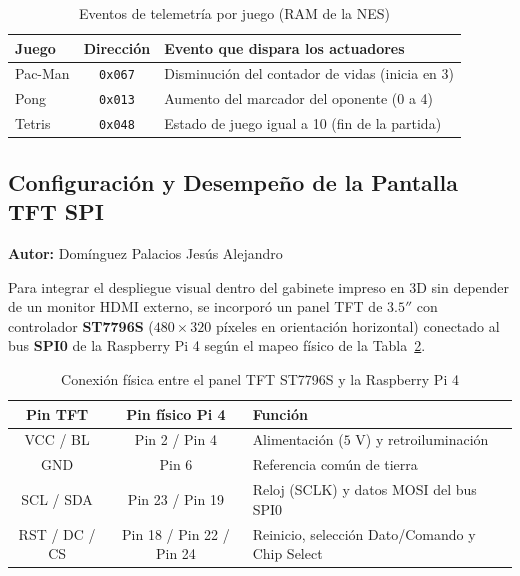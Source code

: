 \begin{table}[H]
	\centering
	\caption{Eventos de telemetría por juego (RAM de la NES)}
	\label{tab:telemetria_juegos}
	\footnotesize
	\begin{tabular}{|l|c|p{5.6cm}|}
		\hline
		\textbf{Juego} & \textbf{Dirección} & \textbf{Evento que dispara los actuadores} \\
		\hline
		Pac-Man & \texttt{0x067} & Disminución del contador de vidas (inicia en 3) \\
		\hline
		Pong & \texttt{0x013} & Aumento del marcador del oponente (0 a 4) \\
		\hline
		Tetris & \texttt{0x048} & Estado de juego igual a 10 (fin de la partida) \\
		\hline
	\end{tabular}
\end{table}

\subsection{Configuración y Desempeño de la Pantalla TFT SPI}
\textbf{Autor:} Domínguez Palacios Jesús Alejandro

Para integrar el despliegue visual dentro del gabinete impreso en 3D sin depender de un monitor HDMI externo, se incorporó un panel TFT de $3.5''$ con controlador \textbf{ST7796S} ($480 \times 320$ píxeles en orientación horizontal) conectado al bus \textbf{SPI0} de la Raspberry Pi 4 según el mapeo físico de la Tabla~\ref{tab:pines_tft}.

\begin{table}[H]
	\centering
	\caption{Conexión física entre el panel TFT ST7796S y la Raspberry Pi 4}
	\label{tab:pines_tft}
	\footnotesize
	\begin{tabular}{|c|c|l|}
		\hline
		\textbf{Pin TFT} & \textbf{Pin físico Pi 4} & \textbf{Función} \\
		\hline
		VCC / BL & Pin 2 / Pin 4 & Alimentación ($5\text{ V}$) y retroiluminación \\
		\hline
		GND & Pin 6 & Referencia común de tierra \\
		\hline
		SCL / SDA & Pin 23 / Pin 19 & Reloj (SCLK) y datos MOSI del bus SPI0 \\
		\hline
		RST / DC / CS & Pin 18 / Pin 22 / Pin 24 & Reinicio, selección Dato/Comando y Chip Select \\
		\hline
	\end{tabular}
\end{table}

